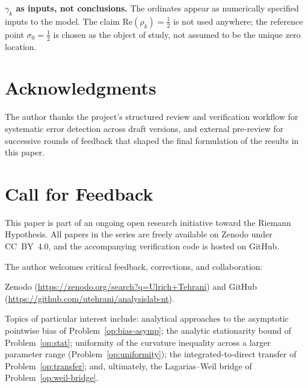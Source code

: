 \documentclass[11pt]{article}
\begin{document}
\textbf{$\gamma_k$ as inputs, not conclusions.}
The ordinates appear as numerically specified inputs to the model.
The claim $\mathrm{Re}(\rho_k)=\tfrac12$ is not used anywhere; the
reference point $\sigma_0=\tfrac12$ is chosen as the object of study,
not assumed to be the unique zero location.

\section*{Acknowledgments}

The author thanks the project's structured review and verification
workflow for systematic error detection across draft versions, and
external pre-review for successive rounds of feedback that shaped the
final formulation of the results in this paper.

\section*{Call for Feedback}

This paper is part of an ongoing open research initiative toward the
Riemann Hypothesis.
All papers in the series are freely available on Zenodo under CC~BY~4.0,
and the accompanying verification code is hosted on GitHub.

The author welcomes critical feedback, corrections, and collaboration:
{\sloppy
Zenodo (\url{https://zenodo.org/search?q=Ulrich+Tehrani}) and GitHub
(\url{https://github.com/utehrani/analysislab-nt}).
\par}

Topics of particular interest include: analytical approaches to the
asymptotic pointwise bias of Problem~\ref{op:bias-asymp}; the analytic
stationarity bound of Problem~\ref{op:stat}; uniformity of the
curvature inequality across a larger parameter range
(Problem~\ref{op:uniformity}); the integrated-to-direct transfer of
Problem~\ref{op:transfer}; and, ultimately, the Lagarias--Weil bridge
of Problem~\ref{op:weil-bridge}.
\end{document}
